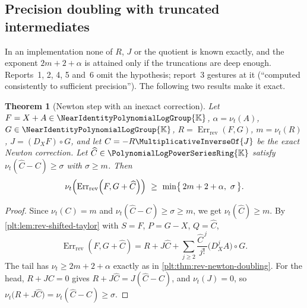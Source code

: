 \documentclass[11pt,oneside]{article}
\theoremstyle{plain}
\newtheorem{theorem}{Theorem}[section]
\theoremstyle{definition}
\theoremstyle{remark}
\newcommand{\K}{\mathbb{K}}
\newcommand{\PLpow}{\PolynomialLogPowerSeriesRing{\K}}   %
\newcommand{\Gnear}{\NearIdentityPolynomialLogGroup{\K}} %
\newcommand{\ordt}{\nu_{t}}                              %
\newcommand{\DX}{D_{X}}                                  %
\newcommand{\compose}{\mathbin{\circ}}
\newcommand{\RevErr}[2]{\operatorname{Err}_{\mathrm{rev}}\!\left(#1,#2\right)}
\begin{document}
\subsection{Precision doubling with truncated intermediates}
\label{plt:sec:rev-guard}

In an implementation none of \(R\), \(J\) or the quotient is known exactly, and
the exponent \(2m+2+\alpha\) is attained only if the truncations are deep
enough.  Reports~1, 2, 4, 5 and~6 omit the hypothesis; report~3 gestures at it
(``computed consistently to sufficient precision'').  The following two results
make it exact.

\begin{theorem}[Newton step with an inexact correction]
\label{plt:thm:rev-newton-guard}
Let \(F=X+A\in\Gnear\), \(\alpha=\ordt(A)\), \(G\in\Gnear\),
\(R=\RevErr{F}{G}\), \(m=\ordt(R)\), \(J=(\DX F)\compose G\), and let
\(C=-R\MultiplicativeInverseOf{J}\) be the exact Newton correction.  Let
\(\widehat C\in\PLpow\) satisfy \(\ordt(\widehat C-C)\ge\sigma\) with
\(\sigma\ge m\).  Then
\begin{equation}\label{plt:eq:rev-newton-guard}
 \ordt\Bigl(\RevErr{F}{G+\widehat C}\Bigr)
 \ \ge\ \min\bigl\{\,2m+2+\alpha,\ \sigma\,\bigr\}.
\end{equation}
\end{theorem}

\begin{proof}
Since \(\ordt(C)=m\) and \(\ordt(\widehat C-C)\ge\sigma\ge m\), we get
\(\ordt(\widehat C)\ge m\).  By \cref{plt:lem:rev-shifted-taylor} with
\(S=F\), \(P=G-X\), \(Q=\widehat C\),
\[
 \RevErr{F}{G+\widehat C}
 =R+J\widehat C
 +\sum_{j\ge2}\frac{\widehat C^{\,j}}{j!}\bigl(\DX^jA\bigr)\compose G .
\]
The tail has \(\ordt\ge2m+2+\alpha\) exactly as in
\cref{plt:thm:rev-newton-doubling}.  For the head, \(R+JC=0\) gives
\(R+J\widehat C=J(\widehat C-C)\), and \(\ordt(J)=0\), so
\(\ordt\bigl(R+J\widehat C\bigr)=\ordt(\widehat C-C)\ge\sigma\).
\end{proof}
\end{document}
